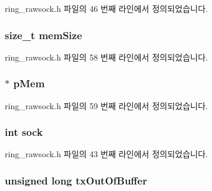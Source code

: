 ring\+\_\+rawsock.\+h 파일의 46 번째 라인에서 정의되었습니다.

\subsubsection[{\texorpdfstring{mem\+Size}{memSize}}]{\setlength{\rightskip}{0pt plus 5cm}size\+\_\+t mem\+Size}\hypertarget{structring__rawsock__t_a0c5a5c70b20489656e038a0281d514c4}{}\label{structring__rawsock__t_a0c5a5c70b20489656e038a0281d514c4}


ring\+\_\+rawsock.\+h 파일의 58 번째 라인에서 정의되었습니다.

\subsubsection[{\texorpdfstring{p\+Mem}{pMem}}]{$\ast$ p\+Mem}\hypertarget{structring__rawsock__t_ac6fe146258c3cdfbead7faecd622c7fb}{}\label{structring__rawsock__t_ac6fe146258c3cdfbead7faecd622c7fb}


ring\+\_\+rawsock.\+h 파일의 59 번째 라인에서 정의되었습니다.

\subsubsection[{\texorpdfstring{sock}{sock}}]{\setlength{\rightskip}{0pt plus 5cm}int sock}\hypertarget{structring__rawsock__t_a5903d0b282fc5eae503de618f896b5e1}{}\label{structring__rawsock__t_a5903d0b282fc5eae503de618f896b5e1}


ring\+\_\+rawsock.\+h 파일의 43 번째 라인에서 정의되었습니다.

\subsubsection[{\texorpdfstring{tx\+Out\+Of\+Buffer}{txOutOfBuffer}}]{\setlength{\rightskip}{0pt plus 5cm}unsigned long tx\+Out\+Of\+Buffer}\hypertarget{structring__rawsock__t_a93b332533b50c7524d3eb7fc03a8df7a}{}\label{structring__rawsock__t_a93b332533b50c7524d3eb7fc03a8df7a}


